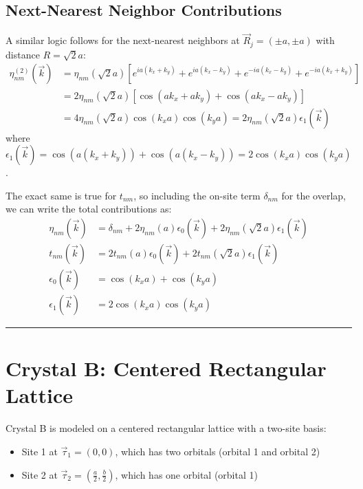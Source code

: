 \documentclass[11pt]{article}
\begin{document}
\subsection*{Next-Nearest Neighbor Contributions}

A similar logic follows for the next-nearest neighbors at $\vec{R}_{j} = (\pm a, \pm a)$ with distance $R = \sqrt{2}a$:
\begin{align*}
	\eta^{(2)}_{nm}(\vec{k}) &= \eta_{nm}(\sqrt{2}a) \left[e^{i a(k_{x} + k_{y})} + e^{i a(k_{x} - k_{y})} + e^{-i a(k_{x} - k_{y})} + e^{-i a(k_{x} + k_{y})}\right] \\
	&= 2 \eta_{nm}(\sqrt{2}a)\left[\cos(a k_{x} + a k_{y}) + \cos(a k_{x} - a k_{y})\right] \\
	&= 4 \eta_{nm}(\sqrt{2}a) \cos(k_{x}a) \cos(k_{y}a) = 2 \eta_{nm}(\sqrt{2}a) \epsilon_{1}(\vec{k})
\end{align*}
where $\epsilon_{1}(\vec{k}) = \cos(a(k_{x} + k_{y})) + \cos(a(k_{x} - k_{y})) = 2 \cos(k_{x}a) \cos(k_{y}a)$.

The exact same is true for $t_{nm}$, so including the on-site term $\delta_{nm}$ for the overlap, we can write the total contributions as:
\begin{align*}
	\eta_{nm}(\vec{k}) &= \delta_{nm} + 2 \eta_{nm}(a) \epsilon_{0}(\vec{k}) + 2 \eta_{nm}(\sqrt{2}a) \epsilon_{1}(\vec{k}) \\
	t_{nm}(\vec{k}) &= 2 t_{nm}(a) \epsilon_{0}(\vec{k}) + 2 t_{nm}(\sqrt{2}a) \epsilon_{1}(\vec{k}) \\[1em]
	\epsilon_{0}(\vec{k}) &= \cos(k_{x}a) + \cos(k_{y}a) \\
	\epsilon_{1}(\vec{k}) &= 2 \cos(k_{x}a) \cos(k_{y}a)
\end{align*}

\bigskip
\hrule
\bigskip

\section{Crystal B: Centered Rectangular Lattice}

Crystal B is modeled on a centered rectangular lattice with a two-site basis:
\begin{itemize}
    \item Site 1 at $\vec{\tau}_1 = (0, 0)$, which has two orbitals (orbital 1 and orbital 2)
    \item Site 2 at $\vec{\tau}_2 = \left(\frac{a}{2}, \frac{b}{2}\right)$, which has one orbital (orbital 1)
\end{itemize}
\end{document}
